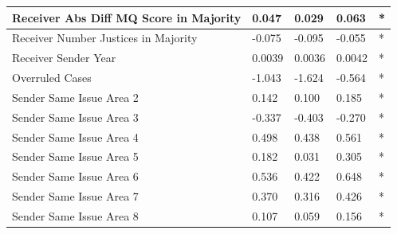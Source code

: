 \documentclass[headsepline=true, abstracton]{scrartcl}
\begin{document}
\begin{table}[htp]
\begin{tabular}{|
>{\columncolor[HTML]{EFEFEF}}l |l|l|l|l|}
Receiver Abs Diff MQ Score in Majority             & 0.047                           & 0.029                              & 0.063                              & *                                     \\ \hline
Receiver Number Justices in Majority               & -0.075                           & -0.095                              & -0.055                              & *                                    \\ \hline
Receiver  Sender Year                              & 0.0039                           & 0.0036                              & 0.0042                              & *                                    \\ \hline
Overruled Cases   & -1.043                           & -1.624                              & -0.564                              & *                                    \\ \hline
Sender Same Issue Area 2                           & 0.142                            & 0.100                               & 0.185                               & *                                    \\ \hline
Sender Same Issue Area 3                           & -0.337                           & -0.403                              & -0.270                              & *                                    \\ \hline
Sender Same Issue Area 4                           & 0.498                            & 0.438                               & 0.561                               & *                                    \\ \hline
Sender Same Issue Area 5                           & 0.182                            & 0.031                               & 0.305                               & *                                    \\ \hline
Sender Same Issue Area 6                           & 0.536                            & 0.422                               & 0.648                               & *                                    \\ \hline
Sender Same Issue Area 7                           & 0.370                            & 0.316                               & 0.426                               & *                                    \\ \hline
Sender Same Issue Area 8                           & 0.107                            & 0.059                               & 0.156                               & *                                    \\ \hline

\end{tabular}
\end{table}
\end{document}
